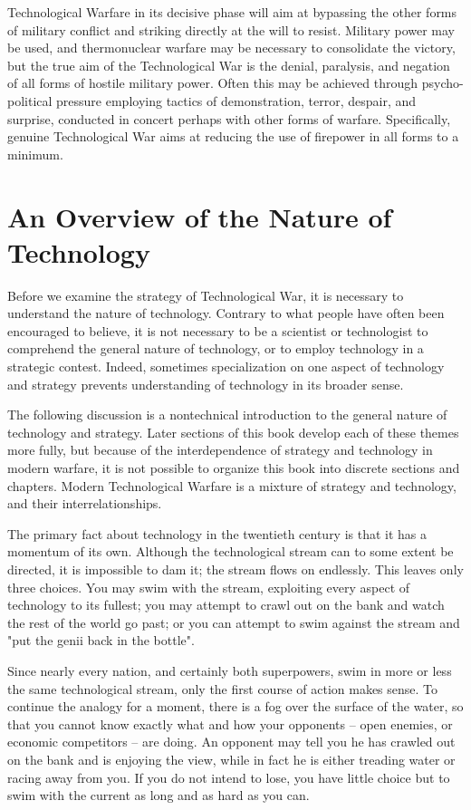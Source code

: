 \documentclass[a4paper,12pt]{book}
\begin{document}
Technological Warfare in its decisive phase will aim at bypassing the other forms of military conflict and striking directly at the will to resist. Military power may be used, and thermonuclear warfare may be necessary to consolidate the victory, but the true aim of the Technological War is the denial, paralysis, and negation of all forms of hostile military power. Often this may be achieved through psycho-political pressure employing tactics of demonstration, terror, despair, and surprise, conducted in concert perhaps with other forms of warfare. Specifically, genuine Technological War aims at reducing the use of firepower in all forms to a minimum.

\section{An Overview of the Nature of Technology}
Before we examine the strategy of Technological War, it is necessary to understand the nature of technology. Contrary to what people have often been encouraged to believe, it is not necessary to be a scientist or technologist to comprehend the general nature of technology, or to employ technology in a strategic contest. Indeed, sometimes specialization on one aspect of technology and strategy prevents understanding of technology in its broader sense.

The following discussion is a nontechnical introduction to the general nature of technology and strategy. Later sections of this book develop each of these themes more fully, but because of the interdependence of strategy and technology in modern warfare, it is not possible to organize this book into discrete sections and chapters. Modern Technological Warfare is a mixture of strategy and technology, and their interrelationships.

The primary fact about technology in the twentieth century is that it has a momentum of its own. Although the technological stream can to some extent be directed, it is impossible to dam it; the stream flows on endlessly. This leaves only three choices. You may swim with the stream, exploiting every aspect of technology to its fullest; you may attempt to crawl out on the bank and watch the rest of the world go past; or you can attempt to swim against the stream and "put the genii back in the bottle".

Since nearly every nation, and certainly both superpowers, swim in more or less the same technological stream, only the first course of action makes sense. To continue the analogy for a moment, there is a fog over the surface of the water, so that you cannot know exactly what and how your opponents -- open enemies, or economic competitors -- are doing. An opponent may tell you he has crawled out on the bank and is enjoying the view, while in fact he is either treading water or racing away from you. If you do not intend to lose, you have little choice but to swim with the current as long and as hard as you can.
\end{document}
